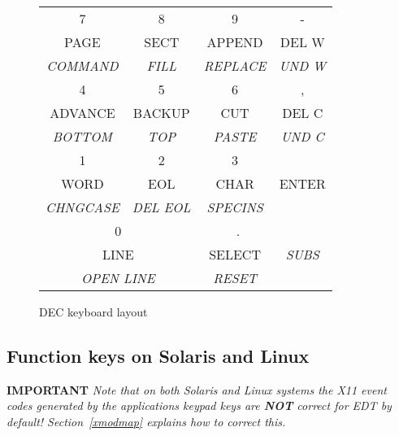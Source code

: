 \documentclass[twoside,11pt]{article}
\newcommand{\xlabel}[1]{}
\begin{document}
\begin{figure}[t]
\begin{center}
\begin{tabular}{|c|c|c|c|}
7        & 8         & 9       & -     \\
PAGE     & SECT      & APPEND  & DEL W \\
\textit{COMMAND}  & \textit{FILL}      & \textit{REPLACE}  & \textit{UND W} \\ \hline
4        & 5         & 6       & ,     \\
ADVANCE  & BACKUP    & CUT     & DEL C \\
\textit{BOTTOM}   & \textit{TOP}       & \textit{PASTE}   & \textit{UND C} \\ \hline
1        & 2         & 3       &       \\
WORD     & EOL       & CHAR    & ENTER \\
\textit{CHNGCASE} & \textit{DEL EOL}   & \textit{SPECINS} &       \\ \cline{1-3}
\multicolumn{2}{|c|}{0}         &~.       &       \\
\multicolumn{2}{|c|}{LINE}      & SELECT  & \textit{SUBS}  \\
\multicolumn{2}{|c|}{\textit{OPEN LINE}} & \textit{RESET}   &       \\ \hline
\end{tabular}
\end{center}
\caption{DEC keyboard layout}
\label{fig:dec-kb}
\normalsize
\end{figure}

\subsection{\xlabel{function_keys_on_solaris_and_linux}
Function keys on Solaris and Linux}
\label{function_keys_on_solaris_and_linux}

\textbf{IMPORTANT} \textit{Note that on both Solaris and Linux systems the
X11 event codes generated by the applications keypad keys are \textbf{NOT} 
correct for EDT by default! Section~{\ref{xmodmap}} explains how
to correct this. }
\end{document}
